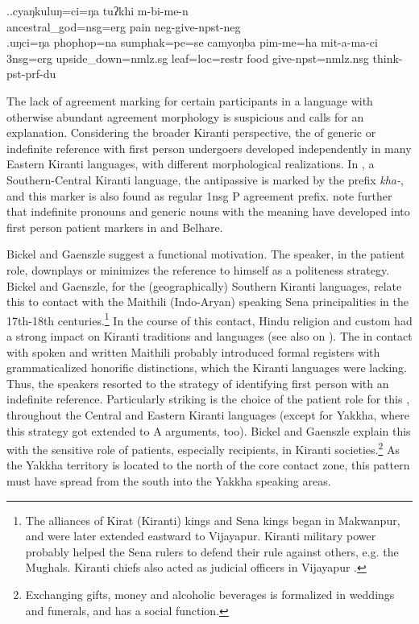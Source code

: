 \ex.\ag.cyaŋkuluŋ=ci=ŋa     tuʔkhi m-bi-me-n\\
ancestral\_god{\sc =nsg=erg} pain {\sc neg-}give{\sc [3A;1.P]-npst-neg}\\
\bg.uŋci=ŋa   phophop=na  sumphak=pe=se   camyoŋba pim-me=ha mit-a-ma-ci\\
{\sc 3nsg=erg} upside\_down{\sc =nmlz.sg} leaf{\sc =loc=restr} food  give{\sc [3A;1.P]-npst=nmlz.nsg} think{\sc -pst-prf-du}\\


The lack of agreement marking for certain participants in a language with otherwise abundant agreement morphology is suspicious and calls for an explanation. Considering the broader Kiranti perspective, the  of generic or indefinite reference with first person undergoers developed independently in many Eastern Kiranti languages, with different morphological realizations. In , a Southern-Central Kiranti language, the antipassive is marked by the prefix \emph{kha-}, and this marker is also found as regular 1nsg P agreement prefix.  \citet[6]{Bickeletal2005Generics} note further that indefinite pronouns and generic nouns with the meaning  have developed into first person patient markers in  and Belhare. 

Bickel and Gaenszle suggest a functional motivation. The speaker, in the patient role, downplays or minimizes the reference to himself as a politeness strategy.  Bickel and Gaenszle, for the (geographically) Southern Kiranti languages, relate this to contact with the Maithili (Indo-Aryan) speaking Sena principalities in the 17th-18th centuries.\footnote{The alliances of Kirat (Kiranti) kings and Sena kings began in Makwanpur, and were later extended eastward to Vijayapur. Kiranti military power probably helped the Sena rulers to defend their rule against others, e.g. the Mughals. Kiranti chiefs also acted as judicial officers in Vijayapur \citep[76]{Pradhan1991The-Gorkha}.} In the course of this contact, Hindu religion and custom had a strong impact on Kiranti traditions and languages (see also \citet{Gaenszleetal2005Worshipping} on ). The in contact with  spoken and written Maithili probably introduced formal registers with grammaticalized honorific distinctions, which the Kiranti languages were lacking. Thus, the speakers resorted to the strategy of identifying first person with an indefinite reference. Particularly striking is  the  choice of the patient role for this , throughout the Central and Eastern Kiranti languages (except for Yakkha, where this strategy got extended to A arguments, too). Bickel and Gaenszle explain this with the sensitive role of patients, especially recipients, in Kiranti societies.\footnote{Exchanging gifts, money and alcoholic beverages is formalized in weddings and funerals, and has a social function.} As the Yakkha territory is located to the north of the core contact zone, this pattern must have spread from the south into the Yakkha speaking areas.



